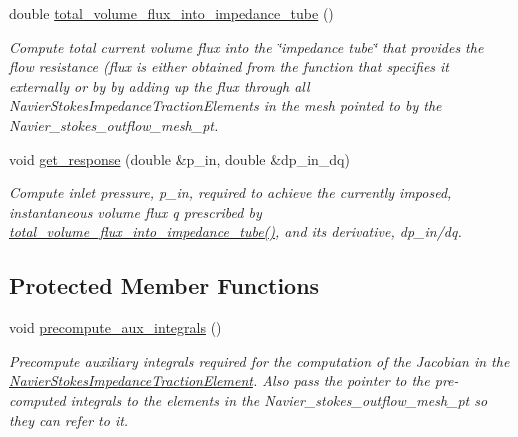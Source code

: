 \begin{DoxyCompactItemize}
double \hyperlink{classoomph_1_1WomersleyImpedanceTubeBase_aa321d54eb9f818975854f8f3cc568256}{total\+\_\+volume\+\_\+flux\+\_\+into\+\_\+impedance\+\_\+tube} ()
\begin{DoxyCompactList}\small\item\em Compute total current volume flux into the \char`\"{}impedance tube\char`\"{} that provides the flow resistance (flux is either obtained from the function that specifies it externally or by by adding up the flux through all Navier\+Stokes\+Impedance\+Traction\+Elements in the mesh pointed to by the Navier\+\_\+stokes\+\_\+outflow\+\_\+mesh\+\_\+pt. \end{DoxyCompactList}\item 
void \hyperlink{classoomph_1_1WomersleyImpedanceTubeBase_a62628115802f53da76c5e4f29de628c7}{get\+\_\+response} (double \&p\+\_\+in, double \&dp\+\_\+in\+\_\+dq)
\begin{DoxyCompactList}\small\item\em Compute inlet pressure, p\+\_\+in, required to achieve the currently imposed, instantaneous volume flux q prescribed by \hyperlink{classoomph_1_1WomersleyImpedanceTubeBase_aa321d54eb9f818975854f8f3cc568256}{total\+\_\+volume\+\_\+flux\+\_\+into\+\_\+impedance\+\_\+tube()}, and its derivative, dp\+\_\+in/dq. \end{DoxyCompactList}\end{DoxyCompactItemize}
\subsection*{Protected Member Functions}
\begin{DoxyCompactItemize}
\item 
void \hyperlink{classoomph_1_1WomersleyImpedanceTubeBase_a64f2f3eeb09a5637b32661baab3ac1e4}{precompute\+\_\+aux\+\_\+integrals} ()
\begin{DoxyCompactList}\small\item\em Precompute auxiliary integrals required for the computation of the Jacobian in the \hyperlink{classoomph_1_1NavierStokesImpedanceTractionElement}{Navier\+Stokes\+Impedance\+Traction\+Element}. Also pass the pointer to the pre-\/computed integrals to the elements in the Navier\+\_\+stokes\+\_\+outflow\+\_\+mesh\+\_\+pt so they can refer to it. \end{DoxyCompactList}\end{DoxyCompactItemize}
